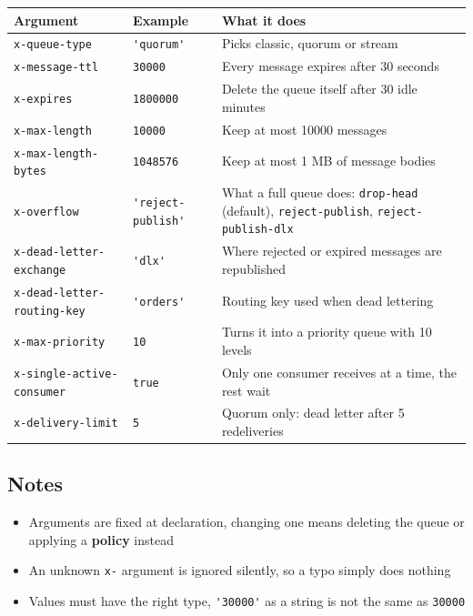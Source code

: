 \documentclass[11pt,a4paper]{article}
\begin{document}
\begin{table}[h]
\centering
\small
\begin{tabularx}{\textwidth}{@{}llX@{}}
\toprule
\rowcolor{tablehead}
\textbf{\color{accent}Argument} & \textbf{\color{accent}Example} & \textbf{\color{accent}What it does} \\
\midrule
\lstinline|x-queue-type|              & \lstinline|'quorum'|         & Picks classic, quorum or stream \\
\lstinline|x-message-ttl|             & \lstinline|30000|            & Every message expires after 30 seconds \\
\lstinline|x-expires|                 & \lstinline|1800000|          & Delete the queue itself after 30 idle minutes \\
\lstinline|x-max-length|              & \lstinline|10000|            & Keep at most 10000 messages \\
\lstinline|x-max-length-bytes|        & \lstinline|1048576|          & Keep at most 1 MB of message bodies \\
\lstinline|x-overflow|                & \lstinline|'reject-publish'| & What a full queue does: \lstinline|drop-head| (default), \lstinline|reject-publish|, \lstinline|reject-publish-dlx| \\
\lstinline|x-dead-letter-exchange|    & \lstinline|'dlx'|            & Where rejected or expired messages are republished \\
\lstinline|x-dead-letter-routing-key| & \lstinline|'orders'|         & Routing key used when dead lettering \\
\lstinline|x-max-priority|            & \lstinline|10|               & Turns it into a priority queue with 10 levels \\
\lstinline|x-single-active-consumer|  & \lstinline|true|             & Only one consumer receives at a time, the rest wait \\
\lstinline|x-delivery-limit|          & \lstinline|5|                & Quorum only: dead letter after 5 redeliveries \\
\bottomrule
\end{tabularx}
\end{table}

\subsection*{Notes}

\begin{itemize}\itemsep2pt
  \item Arguments are fixed at declaration, changing one means deleting the queue or
        applying a \textbf{policy} instead
  \item An unknown \lstinline|x-| argument is ignored silently, so a typo simply does nothing
  \item Values must have the right type, \lstinline|'30000'| as a string is not the same as
        \lstinline|30000|
\end{itemize}
\end{document}
